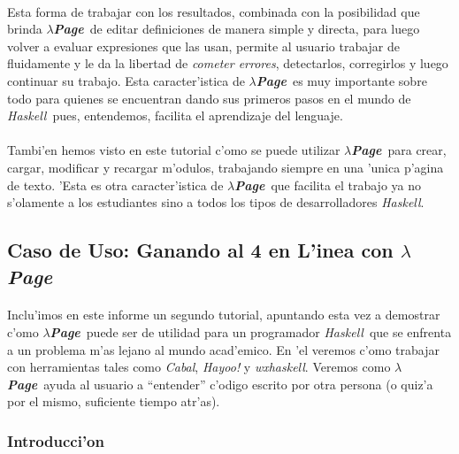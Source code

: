 \documentclass[a4paper]{article}
\newcommand{\haskell}{\textsl{Haskell}}
\newcommand{\hpage}{\textbf{\textsl{$\lambda$Page}}}
\newcommand{\cabal}{\textsl{Cabal}}
\begin{document}
\paragraph{}Esta forma de trabajar con los resultados, combinada con la posibilidad que brinda \hpage\ de editar definiciones de manera simple y directa, para luego volver a evaluar expresiones que las usan, permite al usuario trabajar de fluidamente y le da la libertad de \textsl{cometer errores}, detectarlos, corregirlos y luego continuar su trabajo.  Esta caracter'istica de \hpage\ es muy importante sobre todo para quienes se encuentran dando sus primeros pasos en el mundo de \haskell\ pues, entendemos, facilita el aprendizaje del lenguaje.
\paragraph{}Tambi'en hemos visto en este tutorial c'omo se puede utilizar \hpage\ para crear, cargar, modificar y recargar m'odulos, trabajando siempre en una 'unica p'agina de texto.  'Esta es otra caracter'istica de \hpage\ que facilita el trabajo ya no s'olamente a los estudiantes sino a todos los tipos de desarrolladores \haskell.

\newpage
\subsection{Caso de Uso: Ganando al 4 en L'inea con \hpage}
\begin{epigraphs}
\end{epigraphs}
\paragraph{}Inclu'imos en este informe un segundo tutorial, apuntando esta vez a demostrar c'omo \hpage\ puede ser de utilidad para un programador \haskell\ que se enfrenta a un problema m'as lejano al mundo acad'emico.  En 'el veremos c'omo trabajar con herramientas tales como \cabal, \textsl{Hayoo!} y \textsl{wxhaskell}.  Veremos como \hpage\ ayuda al usuario a ``entender'' c'odigo escrito por otra persona (o quiz'a por el mismo, suficiente tiempo atr'as).
\subsubsection{Introducci'on}
\end{document}
